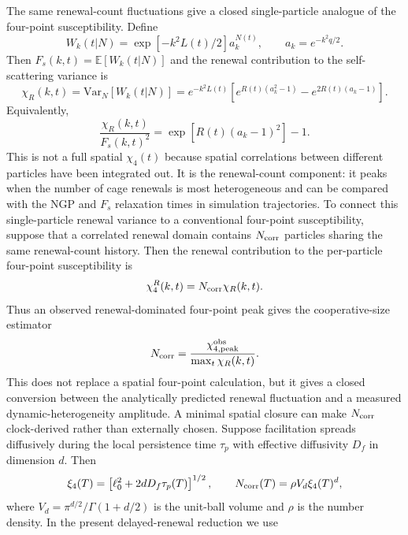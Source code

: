 \documentclass[aps,preprint,onecolumn,superscriptaddress,nofootinbib]{revtex4-2}
\begin{document}
The same renewal-count fluctuations give a closed single-particle analogue of
the four-point susceptibility. Define
\begin{equation}
  W_k(t|N)=\exp[-k^2L(t)/2]a_k^{N(t)},\qquad
  a_k=e^{-k^2q/2}.
\end{equation}
Then $F_s(k,t)=\mathbb{E}[W_k(t|N)]$ and the renewal contribution to the
self-scattering variance is
\begin{equation}
  \chi_R(k,t)=\mathrm{Var}_N[W_k(t|N)]
  =e^{-k^2L(t)}
  \left[
    e^{R(t)(a_k^2-1)}-e^{2R(t)(a_k-1)}
  \right].
\end{equation}
Equivalently,
\begin{equation}
  \frac{\chi_R(k,t)}{F_s(k,t)^2}
  =\exp[R(t)(a_k-1)^2]-1.
\end{equation}
This is not a full spatial $\chi_4(t)$ because spatial correlations between
different particles have been integrated out. It is the renewal-count component:
it peaks when the number of cage renewals is most heterogeneous and can be
compared with the NGP and $F_s$ relaxation times in simulation trajectories.
To connect this single-particle renewal variance to a conventional four-point
susceptibility, suppose that a correlated renewal domain contains $N_{\rm corr}$
particles sharing the same renewal-count history. Then the renewal contribution
to the per-particle four-point susceptibility is
\begin{equation}
  \chi_4^R(k,t)=N_{\rm corr}\chi_R(k,t).
\end{equation}
Thus an observed renewal-dominated four-point peak gives the cooperative-size
estimator
\begin{equation}
  N_{\rm corr}=
  \frac{\chi_{4,\mathrm{peak}}^{\mathrm{obs}}}
       {\max_t \chi_R(k,t)}.
\end{equation}
This does not replace a spatial four-point calculation, but it gives a closed
conversion between the analytically predicted renewal fluctuation and a measured
dynamic-heterogeneity amplitude.
A minimal spatial closure can make $N_{\rm corr}$ clock-derived rather than
externally chosen. Suppose facilitation spreads diffusively during the local
persistence time $\tau_p$ with effective diffusivity $D_f$ in dimension $d$.
Then
\begin{equation}
  \xi_4(T)=\left[\ell_0^2+2dD_f\tau_p(T)\right]^{1/2},
  \qquad
  N_{\rm corr}(T)=\rho V_d\xi_4(T)^d,
\end{equation}
where $V_d=\pi^{d/2}/\Gamma(1+d/2)$ is the unit-ball volume and $\rho$ is the
number density. In the present delayed-renewal reduction we use
\end{document}
